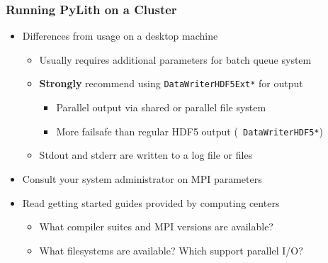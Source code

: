 \documentclass{beamer}
\newcommand{\important}[1]{{\color{red}#1}}
\begin{document}
\begin{frame}
  \frametitle{Running PyLith on a Cluster}

  \begin{itemize}
  \item Differences from usage on a desktop machine
    \begin{itemize}
    \item Usually requires additional parameters for batch
      queue system
    \item {\bf Strongly} recommend using {\tt\important{DataWriterHDF5Ext*}} for output
      \begin{itemize}
      \item Parallel output via shared or parallel file system
      \item More failsafe than regular HDF5 output ({\tt
          DataWriterHDF5*})
      \end{itemize}
    \item Stdout and stderr are written to a log file or files
    \end{itemize}
  \item Consult your system administrator on MPI parameters
  \item Read getting started guides provided by computing centers
    \begin{itemize}
    \item What compiler suites and MPI versions are available?
    \item What filesystems are available? Which support parallel I/O?
    \end{itemize}
  \end{itemize}

\end{frame}
\end{document}
